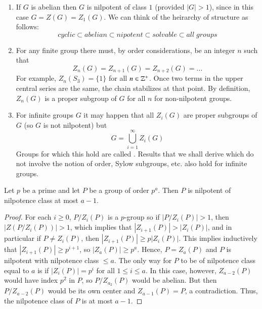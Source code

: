 \begin{rmk}
    \leavevmode
    \begin{enumerate}
        \item If $G$ is abelian then $G$ is nilpotent of class $1$ (provided $|G| > 1$), since in this case $G = Z(G) = Z_1(G)$. We can think of the heirarchy of structure as follows: \begin{equation*}
                cyclic\subset abelian \subset nipotent \subset solvable \subset all\;groups
        \end{equation*}
        \item For any finite group there must, by order considerations, be an integer $n$ such that \begin{equation*}
                Z_n(G) = Z_{n+1}(G) = Z_{n+2}(G) = ...
        \end{equation*}
            For example, $Z_n(S_3) = \{1\}$ for all $n \in \mathbb Z^+$. Once two terms in the upper central series  are the same, the chain stabilizes at that point. By definition, $Z_n(G)$ is a proper subgroup of $G$ for all $n$ for non-nilpotent groups.
        \item For infinite groups $G$ it may happen that all $Z_i(G)$ are proper subgroups of $G$ (so $G$ is not nilpotent) but \begin{equation*}
                G = \bigcup\limits_{i=1}^{\infty}Z_i(G)
        \end{equation*}
            Groups for which this hold are called . Results that we shall derive which do not involve the notion of order, Sylow subgroups, etc. also hold for infinite groups.
    \end{enumerate}
\end{rmk}


\begin{prop}
    Let $p$ be a prime and let $P$ be a group of order $p^a$. Then $P$ is nilpotent of nilpotence class at most $a-1$.
\end{prop}
\begin{proof}
    For each $i \geq 0$, $P/Z_i(P)$ is a $p$-group so if $|P/Z_i(P)| > 1$, then $|Z(P/Z_i(P))| > 1$, which implies that $|Z_{i+1}(P)| > |Z_i(P)|$, and in particular if $P \neq Z_i(P)$, then $|Z_{i+1}(P)| \geq p|Z_i(P)|$. This implies inductively that $|Z_{i+1}(P)| \geq p^{i+1}$, so $|Z_a(P)| \geq p^a$. Hence, $P = Z_a(P)$ and $P$ is nilpotent with nilpotence class $\leq a$. The only way for $P$ to be of nilpotence class equal to $a$ is if $|Z_i(P)| = p^i$ for all $1 \leq i \leq a$. In this case, however, $Z_{a-2}(P)$ would have index $p^2$ in $P$, so $P/Z_{a_2}(P)$ would be abelian. But then $P/Z_{a-2}(P)$ would be its own center and $Z_{a-1}(P) = P$, a contradiction. Thus, the nilpotence class of $P$ is at most $a-1$.
\end{proof}


